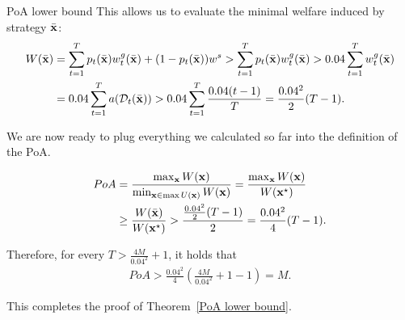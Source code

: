 \begin{proofof}{PoA lower bound}
This allows us to evaluate the minimal welfare induced by strategy $\Bar{{\bf{x}}}$:
\begin{align*}
W(\Bar{{\bf{x}}}) &= \sum_{t = 1}^T p_t(\Bar{{\bf{x}}}) w^g_t(\Bar{{\bf{x}}}) + (1-p_t(\Bar{{\bf{x}}})) w^s > \sum_{t = 1}^T p_t(\Bar{{\bf{x}}}) w^g_t(\Bar{{\bf{x}}}) > 0.04 \sum_{t = 1}^T w^g_t(\Bar{{\bf{x}}}) \\
&= 0.04 \sum_{t = 1}^T a(\mathcal{D}_t(\Bar{{\bf{x}}})) > 0.04 \sum_{t = 1}^T \frac{0.04(t-1)}{T}= \frac{0.04^2}{2}(T-1).
\end{align*}

We are now ready to plug everything we calculated so far into the definition of the PoA.

\begin{align*}
PoA &= \frac{\max_{{\bf{x}}}W({\bf{x}})}{\min_{{\bf{x}} \in \max U({\bf{x}})} W({\bf{x}})} = \frac{\max_{{\bf{x}}}W({\bf{x}})}{W({\bf{x}}^\star)} \\ &\geq \frac{W(\Bar{{\bf{x}}})}{W({\bf{x}}^\star)} > \frac{\frac{0.04^2}{2}(T-1)}{2} = \frac{0.04^2}{4}(T-1).
\end{align*}

Therefore, for every $T > \frac{4M}{0.04^2} + 1$, it holds that
\begin{align*}
PoA > \frac{0.04^2}{4}(\frac{4M}{0.04^2} + 1 -1) = M.
\end{align*}

This completes the proof of Theorem~\ref{PoA lower bound}.
\end{proofof}